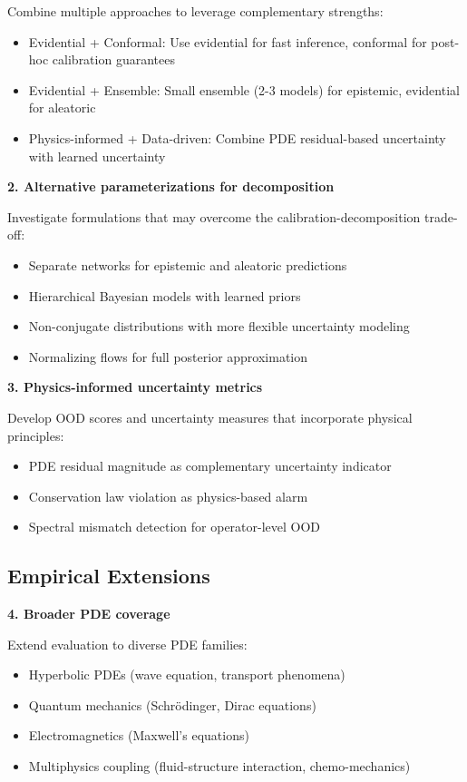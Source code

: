 Combine multiple approaches to leverage complementary strengths:
\begin{itemize}
\item Evidential + Conformal: Use evidential for fast inference, conformal for post-hoc calibration guarantees
\item Evidential + Ensemble: Small ensemble (2-3 models) for epistemic, evidential for aleatoric
\item Physics-informed + Data-driven: Combine PDE residual-based uncertainty with learned uncertainty
\end{itemize}

\textbf{2. Alternative parameterizations for decomposition}

Investigate formulations that may overcome the calibration-decomposition trade-off:
\begin{itemize}
\item Separate networks for epistemic and aleatoric predictions
\item Hierarchical Bayesian models with learned priors
\item Non-conjugate distributions with more flexible uncertainty modeling
\item Normalizing flows \cite{rezende2015variational} for full posterior approximation
\end{itemize}

\textbf{3. Physics-informed uncertainty metrics}

Develop OOD scores and uncertainty measures that incorporate physical principles:
\begin{itemize}
\item PDE residual magnitude as complementary uncertainty indicator
\item Conservation law violation as physics-based alarm
\item Spectral mismatch detection for operator-level OOD
\end{itemize}

\subsection{Empirical Extensions}

\textbf{4. Broader PDE coverage}

Extend evaluation to diverse PDE families:
\begin{itemize}
\item Hyperbolic PDEs (wave equation, transport phenomena)
\item Quantum mechanics (Schrödinger, Dirac equations)
\item Electromagnetics (Maxwell's equations)
\item Multiphysics coupling (fluid-structure interaction, chemo-mechanics)
\end{itemize}

